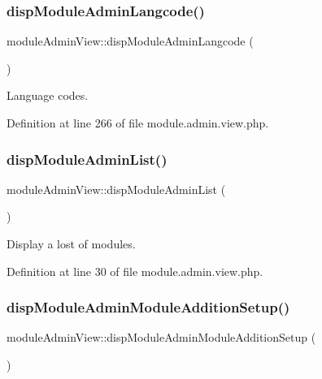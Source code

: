 \subsubsection{\texorpdfstring{disp\+Module\+Admin\+Langcode()}{dispModuleAdminLangcode()}}
{\footnotesize\ttfamily module\+Admin\+View\+::disp\+Module\+Admin\+Langcode (\begin{DoxyParamCaption}{ }\end{DoxyParamCaption})}



Language codes. 



Definition at line 266 of file module.\+admin.\+view.\+php.

\hypertarget{classmoduleAdminView_a9fcb82dc32bc423eda912b34d0cabd00}{}\label{classmoduleAdminView_a9fcb82dc32bc423eda912b34d0cabd00} 
\subsubsection{\texorpdfstring{disp\+Module\+Admin\+List()}{dispModuleAdminList()}}
{\footnotesize\ttfamily module\+Admin\+View\+::disp\+Module\+Admin\+List (\begin{DoxyParamCaption}{ }\end{DoxyParamCaption})}



Display a lost of modules. 



Definition at line 30 of file module.\+admin.\+view.\+php.

\hypertarget{classmoduleAdminView_aa880758b1a06f6ba2417311b1a1a9fc8}{}\label{classmoduleAdminView_aa880758b1a06f6ba2417311b1a1a9fc8} 
\subsubsection{\texorpdfstring{disp\+Module\+Admin\+Module\+Addition\+Setup()}{dispModuleAdminModuleAdditionSetup()}}
{\footnotesize\ttfamily module\+Admin\+View\+::disp\+Module\+Admin\+Module\+Addition\+Setup (\begin{DoxyParamCaption}{ }\end{DoxyParamCaption})}



